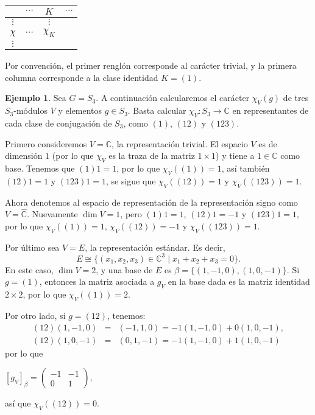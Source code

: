 \documentclass[12pt]{book}
\theoremstyle{definition}
\newtheorem{example}[theorem]{Ejemplo}
\newcounter{in}
\begin{document}
\begin{center}
  \begin{tabular}{c |c c c}
    & $\cdots$ & $K$ & $\cdots$\\
    \hline
    $\vdots$ &  & $\vdots$  \\
    $\chi$   & $\cdots$ & $\chi_{K}$  \\
    $\vdots$ &          &   
  \end{tabular}
\end{center}
Por convención, el primer renglón corresponde al carácter trivial, y la
primera columna corresponde a la clase identidad $K=(1)$.

\begin{example}
  \label{caracteres-S3}
  Sea $G=S_{3}$. A continuación calcularemos el
  carácter $\chi_{V}(g)$ de tres $S_{3}$-módulos $V$ y elementos
  $g\in S_{3}$. Basta calcular $\chi_{V}:S_{3}\rightarrow\mathbb{C}$
  en representantes de cada clase de conjugación de $S_{3}$, como $(1)$,
  $(12)$ y $(123)$.
  
  Primero consideremos $V=\mathbb{C}$, la representación trivial. El
  espacio $V$ es de dimensión $1$ (por lo que $\chi_{V}$ es la traza de
  la matriz $1\times 1$) y tiene a $1\in \mathbb{C}$ como
  base. Tenemos que $(1)1=1$, por lo que $\chi_{V}((1))=1$, así también
  $(12)1=1$ y $(123)1=1$, se sigue que $\chi_{V}((12))=1$ y
  $\chi_{V}((123))=1$.

  Ahora denotemos al espacio de representación de la representación
  signo como $V=\mathbb{\hat C}$. Nuevamente
  $\dim V=1$, pero $(1)1=1$, $(12)1=-1$ y $(123)1=1$, por lo que
  $\chi_{V}((1))=1$,  $\chi_{V}((12))=-1$ y  $\chi_{V}((123))=1$.

  Por último sea $V=E$, la representación estándar. Es decir,
  \begin{equation*}
    E\cong\{(x_{1},x_{2},x_{3})\in \mathbb{C}^{3}\mid x_{1}+x_{2}+x_{3}=0\}.
  \end{equation*}
  En este caso, $\dim V=2$, y una base de $E$ es
  $\beta=\{(1,-1,0),(1,0,-1)\}$. Si $g=(1)$, entonces la matriz
  asociada a $g_{V}$ en la base dada es la matriz identidad $2\times
  2$, por lo que $\chi_{V}((1))=2$.
  
  Por otro lado, si $g=(12)$, tenemos:
  \begin{eqnarray*}
    (12)(1,-1,0)&=&(-1,1,0)=-1(1,-1,0)+0(1,0,-1),\\
    (12)(1,0,-1)&=&(0,1,-1)=-1(1,-1,0)+1(1,0,-1)
  \end{eqnarray*} 
  por lo que 
  \begin{center}
  $[g_{V}]_{\beta}=
  \begin{pmatrix}
    -1 & -1 \\
    0 & 1 
  \end{pmatrix}$,
\end{center}
así que $\chi_{V}((12))=0$.


\end{example}
\end{document}
